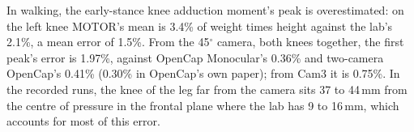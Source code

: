 \documentclass[11pt]{article}
\newcommand{\dg}{\ensuremath{^\circ}}
\begin{document}
In walking, the early-stance knee adduction moment's peak is overestimated: on the left knee MOTOR's mean is 3.4\%
of weight times height against the lab's 2.1\%, a mean error of 1.5\%. From the 45\dg{} camera, both knees together,
the first peak's error is 1.97\%, against OpenCap Monocular's 0.36\% and two-camera OpenCap's 0.41\% (0.30\% in
OpenCap's own paper); from Cam3 it is 0.75\%. In the
recorded runs, the knee of the leg far from the camera sits 37 to 44\,mm from the centre of pressure in the frontal
plane where the lab has 9 to 16\,mm, which accounts for most of this error.
\end{document}
